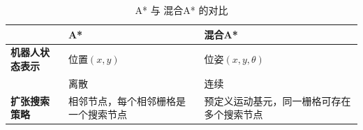 \documentclass[../main.tex]{subfiles}
\begin{document}
\begin{enumerate}
\begin{itemize}
            \begin{table}[H]
              \centering
              \caption{A* 与 混合A* 的对比}
              \begin{tabular}{@{}l
                  >{\raggedright\arraybackslash}p{4cm}
                  >{\raggedright\arraybackslash}p{6cm}@{}}
                \toprule
                 & \textbf{A*} & \textbf{混合A*} \\
                \midrule
                \textbf{机器人状态表示} & 位置$(x, y)$ & 位姿$(x, y, \theta)$ \\
                                       & 离散 & 连续 \\
                \midrule
                \textbf{扩张搜索策略} &
                  相邻节点，每个相邻栅格是一个搜索节点 &
                  预定义运动基元，同一栅格可存在多个搜索节点 \\
                \bottomrule
              \end{tabular}
            \end{table}



\end{itemize}
\end{enumerate}
\end{document}
